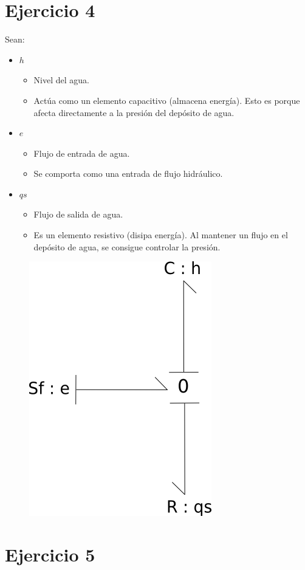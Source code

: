 \documentclass[12pt]{article}
\begin{document}
\section{Ejercicio 4}
Sean:
\begin{itemize}
    \item $h$
        \begin{itemize}
            \item Nivel del agua.
            \item Actúa como un elemento capacitivo (almacena energía). Esto es porque afecta
                  directamente a la presión del depósito de agua.
        \end{itemize}
    \item $e$
        \begin{itemize}
            \item Flujo de entrada de agua.
            \item Se comporta como una entrada de flujo hidráulico.
        \end{itemize}
    \item $qs$
        \begin{itemize}
            \item Flujo de salida de agua.
            \item Es un elemento resistivo (disipa energía). Al mantener un flujo en el depósito de
                  agua, se consigue controlar la presión.
        \end{itemize}
\end{itemize}
\begin{figure}[H]
    \center
    \includegraphics[scale=0.35]{tanque.png}
\end{figure}
\newpage

\section{Ejercicio 5}
\end{document}
